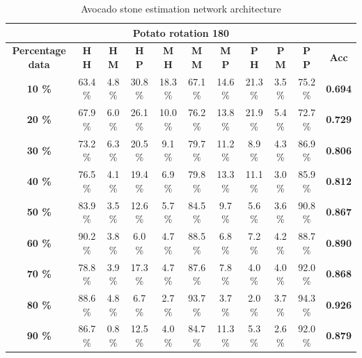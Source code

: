 \documentclass[11pt]{article}
\begin{document}
  \begin{table}[h!]
  \centering
  \begin{adjustbox}{max width=\textwidth}
  \begin{tabular}{*{11}{c}}%
  \hline
  \multicolumn{11}{c}{\textbf{Potato rotation 180}}
  \\
 \hline
 \textbf{Percentage data} & \textbf{H H} & \textbf{H M} & \textbf{H P} & \textbf{M H} & \textbf{M M} & \textbf{M P} & \textbf{P H} & \textbf{P M} & \textbf{P P} & \textbf{Acc}\\
 \hline
 \hline
 \textbf{10 \%}  & 63.4 \% & 4.8 \% & 30.8 \% & 18.3 \% & 67.1 \% & 14.6 \% & 21.3 \% & 3.5 \% & 75.2 \% & \textbf{0.694} \\
 \hline
 \textbf{20 \%} & 67.9 \% & 6.0 \% & 26.1 \% & 10.0 \% & 76.2 \% & 13.8 \% & 21.9 \% & 5.4 \% & 72.7 \% & \textbf{0.729} \\
 \hline
 \textbf{30 \%} & 73.2 \% & 6.3 \% & 20.5 \% & 9.1 \% & 79.7 \% & 11.2 \% & 8.9 \% & 4.3 \% & 86.9 \% & \textbf{0.806} \\
 \hline
 \textbf{40 \%} & 76.5 \% & 4.1 \% & 19.4 \% & 6.9 \% & 79.8 \% & 13.3 \% & 11.1 \% & 3.0 \%  & 85.9 \% & \textbf{0.812} \\
 \hline
 \textbf{50 \%} & 83.9 \% & 3.5 \% & 12.6 \% & 5.7 \% & 84.5 \% & 9.7 \% & 5.6 \% & 3.6 \% & 90.8 \% & \textbf{0.867} \\
 \hline
 \textbf{60 \%} & 90.2 \% & 3.8 \% & 6.0 \% & 4.7 \% & 88.5 \% & 6.8 \% & 7.2 \% & 4.2 \% & 88.7 \% & \textbf{0.890} \\
 \hline
 \textbf{70 \%} & 78.8 \% & 3.9 \% & 17.3 \% & 4.7 \% & 87.6 \% & 7.8 \% & 4.0 \% & 4.0 \% & 92.0 \% & \textbf{0.868} \\
 \hline
\textbf{80 \%} & 88.6 \% & 4.8 \% & 6.7 \%  & 2.7 \% & 93.7 \% & 3.7 \% & 2.0 \% & 3.7 \% & 94.3 \% & \textbf{0.926} \\
 \hline
 \textbf{90 \%} & 86.7 \% & 0.8 \% & 12.5 \% & 4.0 \% & 84.7 \% & 11.3 \% & 5.3 \% & 2.6 \% & 92.0 \% & \textbf{0.879} \\
 \hline
\end{tabular}
\end{adjustbox}
  \caption{Avocado stone estimation network architecture}
  \label{tab:experiments_avo_cnn}
\end{table}
\end{document}
